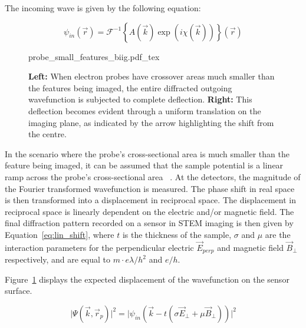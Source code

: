 The incoming wave is given by the following equation:

\begin{equation}
    \psi_{in}(\vec{r})=\mathcal{F}^{-1}\left\{A(\vec{k})\exp(i\chi(\vec{k}))\right\}(\vec{r})
    \label{eq:in_wav}
\end{equation}




\begin{figure}[h]
	\centering
	\def\svgwidth{1\linewidth}
	{probe_small_features_biig.pdf_tex}
    \caption{\textbf{Left:} When electron probes have crossover areas much smaller than the features being imaged, the entire diffracted outgoing wavefunction is subjected to complete deflection. \textbf{Right:} This deflection becomes evident through a uniform translation on the imaging plane, as indicated by the arrow highlighting the shift from the centre.}
	\label{fig:small_probe}
\end{figure}

In the scenario where the probe's cross-sectional area is much smaller than the feature being imaged, it can be assumed that the sample potential is a linear ramp across the probe's cross-sectional area ~\cite{caoTheoryPracticeElectron2018}. 
%
At the detectors, the magnitude of the Fourier transformed wavefunction is measured. The phase shift in real space is then transformed into a displacement in reciprocal space.
%
The displacement in reciprocal space is linearly dependent on the electric and/or magnetic field. The final diffraction pattern recorded on a sensor in STEM imaging is then given by Equation~\ref{eq:lin_shift}, where $t$ is the thickness of the sample, $\sigma$ and $\mu$ are the interaction parameters for the perpendicular electric $\vec{E}_{perp}$ and magnetic field $\vec{B}_{\perp}$ respectively, and are equal to $m\cdot e \lambda / h^ 2$ and $e / h$. 

Figure~\ref{fig:small_probe} displays the expected displacement of the wavefunction on the sensor surface.

\begin{equation}
    \vert \Psi(\vec{k},\vec{r}_p)\vert^2 = \vert \psi_{in}(\vec{k}-t(\sigma \vec{E}_{\perp}+\mu \vec{B}_{\perp}))\vert^2
    \label{eq:lin_shift}
\end{equation}


